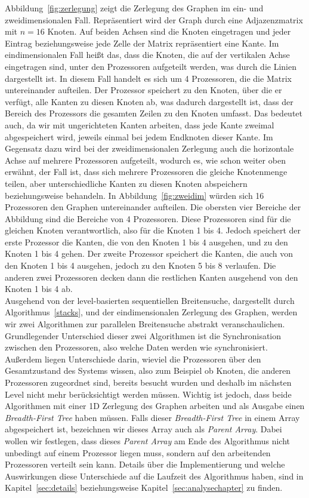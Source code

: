 \documentclass[11pt,a4paper]{article}
\begin{document}
Abbildung~\ref{fig:zerlegung} zeigt die Zerlegung des Graphen im ein- und zweidimensionalen Fall. Repräsentiert wird der Graph durch eine Adjazenzmatrix mit \(n = 16\) Knoten. Auf beiden Achsen sind die Knoten eingetragen und jeder Eintrag beziehungsweise jede Zelle der Matrix repräsentiert eine Kante. Im eindimensionalen Fall heißt das, dass die Knoten, die auf der vertikalen Achse eingetragen sind, unter den Prozessoren aufgeteilt werden, was durch die Linien dargestellt ist. In diesem Fall handelt es sich um 4 Prozessoren, die die Matrix untereinander aufteilen. Der Prozessor speichert zu den Knoten, über die er verfügt, alle Kanten zu diesen Knoten ab, was dadurch dargestellt ist, dass der Bereich des Prozessors die gesamten Zeilen zu den Knoten umfasst. Das bedeutet auch, da wir mit ungerichteten Kanten arbeiten, dass jede Kante zweimal abgespeichert wird, jeweils einmal bei jedem Endknoten dieser Kante. Im Gegensatz dazu wird bei der zweidimensionalen Zerlegung auch die horizontale Achse auf mehrere Prozessoren aufgeteilt, wodurch es, wie schon weiter oben erwähnt, der Fall ist, dass sich mehrere Prozessoren die gleiche Knotenmenge teilen, aber unterschiedliche Kanten zu diesen Knoten abspeichern beziehungsweise behandeln. In Abbildung~\ref{fig:zweidim} würden sich 16 Prozessoren den Graphen untereinander aufteilen. Die obersten vier Bereiche der Abbildung sind die Bereiche von 4 Prozessoren. Diese Prozessoren sind für die gleichen Knoten verantwortlich, also für die Knoten 1 bis 4. Jedoch speichert der erste Prozessor die Kanten, die von den Knoten 1 bis 4 ausgehen, und zu den Knoten 1 bis 4 gehen. Der zweite Prozessor speichert die Kanten, die auch von den Knoten 1 bis 4 ausgehen, jedoch zu den Knoten 5 bis 8 verlaufen. Die anderen zwei Prozessoren decken dann die restlichen Kanten ausgehend von den Knoten 1 bis 4 ab.\\
Ausgehend von der level-basierten sequentiellen Breitensuche, dargestellt durch Algorithmus~\ref{stacks}, und der eindimensionalen Zerlegung des Graphen, werden wir zwei Algorithmen zur parallelen Breitensuche abstrakt veranschaulichen. Grundlegender Unterschied dieser zwei Algorithmen ist die Synchronisation zwischen den Prozessoren, also welche Daten werden wie synchronisiert. Außerdem liegen Unterschiede darin, wieviel die Prozessoren über den Gesamtzustand des Systems wissen, also zum Beispiel ob Knoten, die anderen Prozessoren zugeordnet sind, bereits besucht wurden und deshalb im nächsten Level nicht mehr berücksichtigt werden müssen. Wichtig ist jedoch, dass beide Algorithmen mit einer 1D Zerlegung des Graphen arbeiten und als Ausgabe einen \textit{Breadth-First Tree} haben müssen. Falls dieser \textit{Breadth-First Tree} in einem Array abgespeichert ist, bezeichnen wir dieses Array auch als \textit{Parent Array}.  Dabei wollen wir festlegen, dass dieses \textit{Parent Array} am Ende des Algorithmus nicht unbedingt auf einem Prozessor liegen muss, sondern auf den arbeitenden Prozessoren verteilt sein kann. Details über die Implementierung und welche Auswirkungen diese Unterschiede auf die Laufzeit des Algorithmus haben, sind in Kapitel~\ref{sec:details} beziehungsweise Kapitel~\ref{sec:analysechapter} zu finden.
\end{document}
